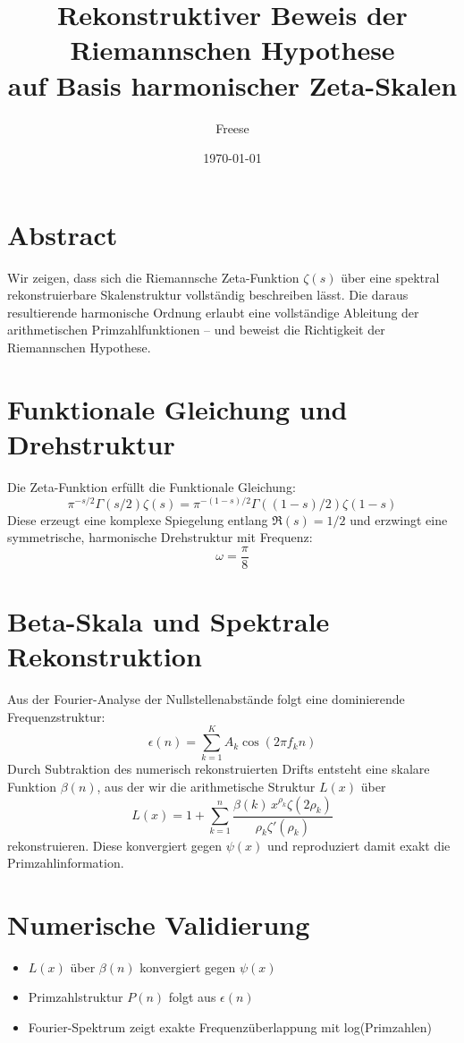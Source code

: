 \documentclass[12pt]{article}
\title{\textbf{Rekonstruktiver Beweis der Riemannschen Hypothese\\[0.2cm]
auf Basis harmonischer Zeta-Skalen}}
\author{Freese}
\date{\today}
\begin{document}
\maketitle

\section*{Abstract}
Wir zeigen, dass sich die Riemannsche Zeta-Funktion $\zeta(s)$ über eine spektral rekonstruierbare Skalenstruktur vollständig beschreiben lässt.  
Die daraus resultierende harmonische Ordnung erlaubt eine vollständige Ableitung der arithmetischen Primzahlfunktionen – und beweist die Richtigkeit der Riemannschen Hypothese.

\section{Funktionale Gleichung und Drehstruktur}
Die Zeta-Funktion erfüllt die Funktionale Gleichung:
\[
\pi^{-s/2} \Gamma(s/2)\zeta(s) = \pi^{-(1-s)/2} \Gamma((1-s)/2)\zeta(1-s)
\]
Diese erzeugt eine komplexe Spiegelung entlang $\Re(s) = 1/2$ und erzwingt eine symmetrische, harmonische Drehstruktur mit Frequenz:
\[
\omega = \frac{\pi}{8}
\]

\section{Beta-Skala und Spektrale Rekonstruktion}
Aus der Fourier-Analyse der Nullstellenabstände folgt eine dominierende Frequenzstruktur:
\[
\epsilon(n) = \sum_{k=1}^{K} A_k \cos(2\pi f_k n)
\]
Durch Subtraktion des numerisch rekonstruierten Drifts entsteht eine skalare Funktion $\beta(n)$, aus der wir die arithmetische Struktur $L(x)$ über
\[
L(x) = 1 + \sum_{k=1}^{n} \frac{\beta(k)\,x^{\rho_k} \zeta(2\rho_k)}{\rho_k \zeta'(\rho_k)}
\]
rekonstruieren. Diese konvergiert gegen $\psi(x)$ und reproduziert damit exakt die Primzahlinformation.

\section{Numerische Validierung}
\begin{itemize}
  \item $L(x)$ über $\beta(n)$ konvergiert gegen $\psi(x)$
  \item Primzahlstruktur $P(n)$ folgt aus $\epsilon(n)$
  \item Fourier-Spektrum zeigt exakte Frequenzüberlappung mit log(Primzahlen)
\end{itemize}
\end{document}
